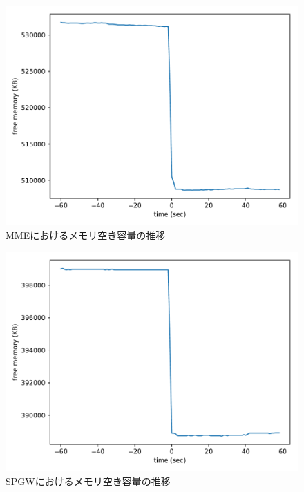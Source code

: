 \documentclass[a4j]{ujarticle}
\begin{document}
\begin{figure}[htbp]
	\centering
	\includegraphics[width=0.7\hsize]{mmeMemory.pdf}
  \caption{MMEにおけるメモリ空き容量の推移}
	\label{mmeMemory}
\end{figure}

\begin{figure}[htbp]
	\centering
	\includegraphics[width=0.7\hsize]{spgwMemory.pdf}
  \caption{SPGWにおけるメモリ空き容量の推移}
	\label{spgwMemory}
\end{figure}
\end{document}
